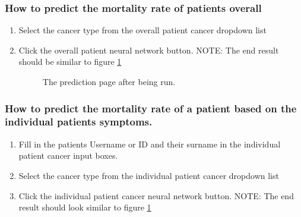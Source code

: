 \documentclass[14pt, a4paper]{article}
\begin{document}
	\subsubsection{How to predict the mortality rate of patients overall}
		\begin{enumerate}
			\item Select the cancer type from the overall patient cancer dropdown list
			\item Click the overall patient neural network button. NOTE: The end result should be similar to figure \ref{fig:predict2}
			\begin{figure}[H]
				\centerline{}
				\caption{The prediction page after being run.}
				\label{fig:predict2}
			\end{figure}
		\end{enumerate}
	\subsubsection{How to predict the mortality rate of a patient based on the individual patients symptoms.}
		\begin{enumerate}
			\item Fill in the patients Username or ID and their surname in the individual patient cancer input boxes.
			\item Select the cancer type from the individual patient cancer dropdown list
			\item Click the individual patient cancer neural network button. NOTE: The end result should look similar to figure \ref{fig:predict2}
		\end{enumerate}
\end{document}
